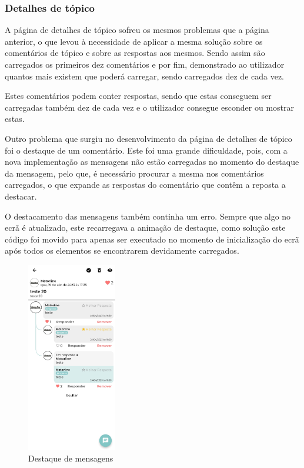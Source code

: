\subsubsection{Detalhes de tópico}

A página de detalhes de tópico sofreu os mesmos problemas que a página anterior, o que levou à necessidade de aplicar a mesma solução sobre os comentários de tópico e sobre as respostas aos mesmos. Sendo assim são carregados os primeiros dez comentários e por fim, demonstrado ao utilizador quantos mais existem que poderá carregar, sendo carregados dez de cada vez.

Estes comentários podem conter respostas, sendo que estas conseguem ser carregadas também dez de cada vez e o utilizador consegue esconder ou mostrar estas.

Outro problema que surgiu no desenvolvimento da página de detalhes de tópico foi o destaque de um comentário. Este foi uma grande dificuldade, pois, com a nova implementação as mensagens não estão carregadas no momento do destaque da mensagem, pelo que, é necessário procurar a mesma nos comentários carregados, o que expande as respostas do comentário que contêm a reposta a destacar.

\newpage

O destacamento das mensagens também continha um erro. Sempre que algo no ecrã é atualizado, este recarregava a animação de destaque, como solução este código foi movido para apenas ser executado no momento de inicialização do ecrã após todos os elementos se encontrarem devidamente carregados.

\begin{figure}[htb]
 \centering
 \includegraphics[width=0.35\textwidth]{images/implementacao/frontend/forum/loading_topics/1686062701127.jpg}
 \caption{Destaque de mensagens}
 \label{fig:75}
\end{figure}